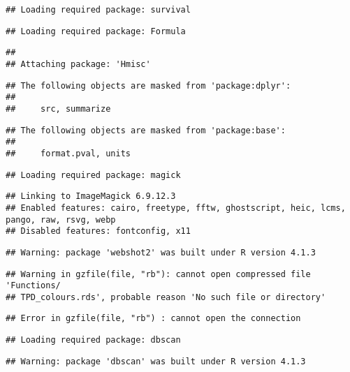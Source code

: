 \documentclass[
]{article}
\begin{document}
\begin{verbatim}
## Loading required package: survival
\end{verbatim}

\begin{verbatim}
## Loading required package: Formula
\end{verbatim}

\begin{verbatim}
## 
## Attaching package: 'Hmisc'
\end{verbatim}

\begin{verbatim}
## The following objects are masked from 'package:dplyr':
## 
##     src, summarize
\end{verbatim}

\begin{verbatim}
## The following objects are masked from 'package:base':
## 
##     format.pval, units
\end{verbatim}

\begin{verbatim}
## Loading required package: magick
\end{verbatim}

\begin{verbatim}
## Linking to ImageMagick 6.9.12.3
## Enabled features: cairo, freetype, fftw, ghostscript, heic, lcms, pango, raw, rsvg, webp
## Disabled features: fontconfig, x11
\end{verbatim}

\begin{verbatim}
## Warning: package 'webshot2' was built under R version 4.1.3
\end{verbatim}

\begin{verbatim}
## Warning in gzfile(file, "rb"): cannot open compressed file 'Functions/
## TPD_colours.rds', probable reason 'No such file or directory'
\end{verbatim}

\begin{verbatim}
## Error in gzfile(file, "rb") : cannot open the connection
\end{verbatim}

\begin{verbatim}
## Loading required package: dbscan
\end{verbatim}

\begin{verbatim}
## Warning: package 'dbscan' was built under R version 4.1.3
\end{verbatim}
\end{document}
